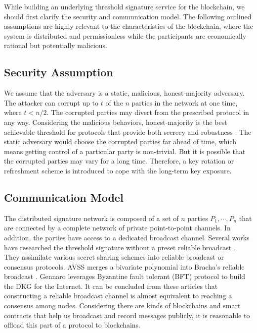 \documentclass[11pt]{article}
\begin{document}
While building an underlying threshold signature service for the blockchain, we should first clarify the security and communication model. The following outlined assumptions are highly relevant to the characteristics of the blockchain, where the system is distributed and permissionless while the participants are economically rational but potentially malicious.

\subsection{Security Assumption}

We assume that the adversary is a static, malicious, honest-majority adversary. The attacker can corrupt up to $t$ of the $n$ parties in the network at one time, where $t < n/2$. The corrupted parties may divert from the prescribed protocol in any way. Considering the malicious behaviors, honest-majority is the best achievable threshold for protocols that provide both secrecy and robustness \cite{gennaro2007secure}. The static adversary would choose the corrupted parties far ahead of time, which means getting control of a particular party is non-trivial. But it is possible that the corrupted parties may vary for a long time. Therefore, a key rotation or refreshment scheme is introduced to cope with the long-term key exposure.

\subsection{Communication Model}

The distributed signature network is composed of a set of $n$ parties $P_1, \cdots, P_n$ that are connected by a complete network of private point-to-point channels. In addition, the parties have access to a dedicated broadcast channel. Several works have researched the threshold signature without a preset reliable broadcast \cite{kate2009distributed,kate2012distributed,cachin2002asynchronous}. They assimilate various secret sharing schemes into reliable broadcast or consensus protocols. AVSS \cite{cachin2002asynchronous} merges a bivariate polynomial into Bracha’s reliable broadcast \cite{bracha1984asynchronous}. Gennaro \cite{gennaro2007secure} leverages Byzantine fault tolerant (BFT) protocol \cite{castro1999practical} to build the DKG for the Internet. It can be concluded from these articles that constructing a reliable broadcast channel is almost equivalent to reaching a consensus among nodes. Considering there are kinds of blockchains and smart contracts that help us broadcast and record messages publicly, it is reasonable to offload this part of a protocol to blockchains.
\end{document}

